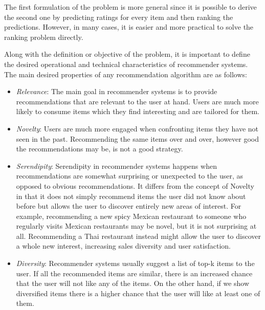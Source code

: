 \documentclass[cic,tc,english]{iiufrgs}
\begin{document}
The first formulation of the problem is more general since it is possible to derive the second one by predicting ratings for every item and then ranking the predictions. However, in many cases, it is easier and more practical to solve the ranking problem directly.

Along with the definition or objective of the problem, it is important to define the desired operational and technical characteristics of recommender systems. The main desired properties of any recommendation algorithm are as follows:
\begin{itemize}
\item \emph{Relevance}: The main goal in recommender systems is to provide recommendations that are relevant to the user at hand. Users are much more likely to consume items which they find interesting and are tailored for them.
\item \emph{Novelty}: Users are much more engaged when confronting items they have not seen in the past. Recommending the same items over and over, however good the recommendations may be, is not a good strategy.
\item \emph{Serendipity}: Serendipity in recommender systems happens when recommendations are somewhat surprising or unexpected to the user, as opposed to obvious recommendations. It differs from the concept of Novelty in that it does not simply recommend items the user did not know about before but allows the user to discover entirely new areas of interest. For example, recommending a new spicy Mexican restaurant to someone who regularly visits Mexican restaurants may be novel, but it is not surprising at all. Recommending a Thai restaurant instead might allow the user to discover a whole new interest, increasing sales diversity and user satisfaction.
\item \emph{Diversity}: Recommender systems usually suggest a list of top-k items to the user. If all the recommended items are similar, there is an increased chance that the user will not like any of the items. On the other hand, if we show diversified items there is a higher chance that the user will like at least one of them.
\end{itemize}
\end{document}
